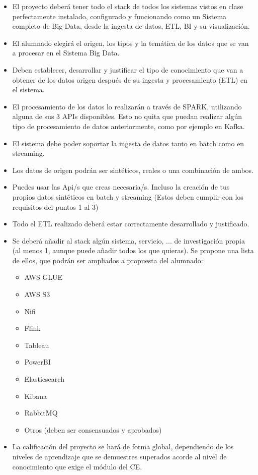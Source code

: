 \documentclass[12pt]{article}
\begin{document}
\begin{itemize}
  \item El proyecto deberá tener todo el stack de todos los sistemas vistos en clase perfectamente instalado, configurado y funcionando como un 
  Sistema completo de Big Data, desde la ingesta de datos, ETL, BI y su visualización.

  \item El alumnado elegirá el origen, los tipos y la temática de los datos que se van a procesar en el Sistema Big Data.
  
  \item Deben establecer, desarrollar y justificar el tipo de conocimiento que van a obtener de los datos origen después de su ingesta y 
  procesamiento (ETL) en el sistema.

  \item El procesamiento de los datos lo realizarán a través de SPARK, utilizando alguna de sus 3 APIs disponibles. Esto no quita que puedan 
  realizar algún tipo de procesamiento de datos anteriormente, como por ejemplo en Kafka.

  \item El sistema debe poder soportar la ingesta de datos tanto en batch como en streaming.
  
  \item Los datos de origen podrán ser sintéticos, reales o una combinación de ambos.
  
  \item Puedes usar las Api/s que creas necesaria/s. Incluso la creación de tus propios datos sintéticos en batch y streaming 
  (Estos deben cumplir con los requisitos del puntos 1 al 3)

  \item Todo el ETL realizado deberá estar correctamente desarrollado y justificado.
  
  \item Se deberá añadir al stack algún sistema, servicio, ... de investigación propia 
  (al menos 1, aunque puede añadir todos los que quieras). Se propone una lista de ellos, 
  que podrán ser ampliados a propuesta del alumnado:

  \begin{itemize}
    \item AWS GLUE
    \item AWS S3
    \item Nifi
    \item Flink
    \item Tableau
    \item PowerBI
    \item Elasticsearch
    \item Kibana
    \item RabbitMQ
    \item Otros (deben ser consensuados y aprobados)
  \end{itemize}

  \item La calificación del proyecto se hará de forma global, dependiendo de los niveles de aprendizaje que se demuestres superados acorde 
  al nivel de conocimiento que exige el módulo del CE.
\end{itemize}
\end{document}

